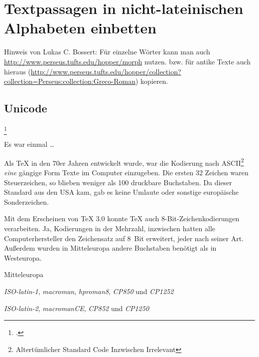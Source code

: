 \chapter{Textpassagen in nicht-lateinischen Alphabeten einbetten}

Hinweis von Lukas C. Bossert:
Für einzelne Wörter kann man auch \url{http://www.perseus.tufts.edu/hopper/morph} nutzen.
bzw. für antike Texte auch hieraus (\url{http://www.perseus.tufts.edu/hopper/collection?collection=Perseus:collection:Greco-Roman}) kopieren.

\section{Unicode}
\footcite{kielhorn:dtk2014}


\noindent Es war einmal \dots

Als \TeX{} in den 70er Jahren entwickelt wurde, war die Kodierung nach 
ASCII\footnote{Altertümlicher Standard Code Inzwischen Irrelevant} \emph{eine}
gängige Form Texte im Computer einzugeben. 
Die ersten 32 Zeichen waren Steuerzeichen, so blieben weniger als 100 druckbare Buchstaben.
Da dieser Standard aus den USA kam, gab es keine Umlaute oder sonstige europäische
Sonderzeichen.

Mit dem Erscheinen von \TeX{} 3.0 konnte \TeX{} auch 8-Bit-Zeichenkodierungen verarbeiten.
Ja, Kodierungen in der Mehrzahl, inzwischen hatten alle Computerhersteller den Zeichensatz
auf 8~Bit erweitert, jeder nach seiner Art. Außerdem wurden in Mitteleuropa andere Buchstaben
benötigt als in Westeuropa.

\begin{labeling}{Mitteleuropa}
    \item[Westeuropa:]
      \emph{ISO-latin-1}, \emph{macroman}, \emph{hproman8}, \emph{CP850} und \emph{CP1252}
    \item[Mitteleuropa:]
      \emph{ISO-latin-2}, \emph{macromanCE}, \emph{CP852} und \emph{CP1250}
\end{labeling}

